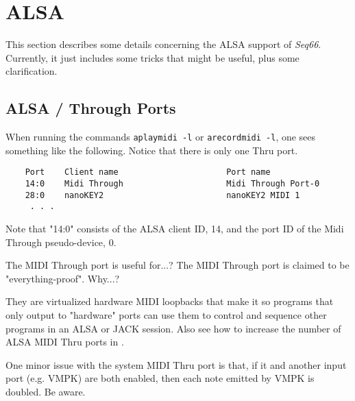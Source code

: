 %
%
%

\section{ALSA}
\label{sec:alsa}

   This section describes some details concerning the ALSA support of
   \textsl{Seq66}.
   Currently, it just includes some tricks that might be useful, plus some
   clarification.

\subsection{ALSA / Through Ports}
\label{subsec:alsa_through_ports}

   When running the commands \texttt{aplaymidi -l} or \texttt{arecordmidi -l},
   one sees something like the following.
   Notice that there is only one Thru port.

   \begin{verbatim}
    Port    Client name                      Port name
    14:0    Midi Through                     Midi Through Port-0
    28:0    nanoKEY2                         nanoKEY2 MIDI 1
     . . .
   \end{verbatim}

   Note that "14:0" consists of the ALSA client ID, 14, and the port ID of the
   Midi Through pseudo-device, 0.

   The MIDI Through port is useful for...?
   The MIDI Through port is claimed to be "everything-proof". Why...?

   They are virtualized hardware MIDI loopbacks that make it so
   programs that only output to "hardware" ports can use them
   to control and sequence other programs in an ALSA or JACK session.
   Also see how to increase the number of ALSA MIDI Thru ports in
   \cite{alsathru}.

   One minor issue with the system MIDI Thru port is that, if it and another
   input port (e.g. VMPK) are both enabled, then each note emitted by VMPK is
   doubled. Be aware.

